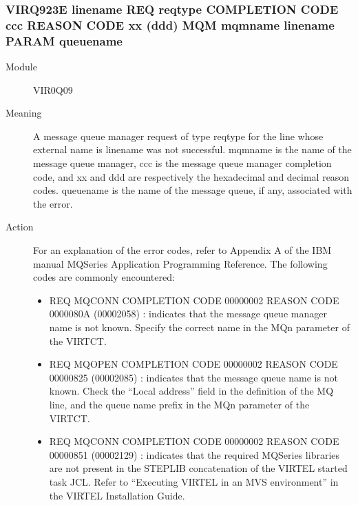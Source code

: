 \documentclass[letterpaper,10pt,english]{sphinxmanual}
\begin{document}
\subsubsection{VIRQ923E linename REQ reqtype COMPLETION CODE ccc REASON CODE xx (ddd) MQM mqmname \textbar{} linename PARAM queuename}
\label{\detokenize{messages:virq923e-linename-req-reqtype-completion-code-ccc-reason-code-xx-ddd-mqm-mqmname-linename-param-queuename}}\begin{description}
\item[{Module}] \leavevmode
VIR0Q09

\item[{Meaning}] \leavevmode
A message queue manager request of type reqtype for the line whose external name is linename was not successful. mqmname is the name of the message queue manager, ccc is the message queue manager completion code, and xx and ddd are respectively the hexadecimal and decimal reason codes. queuename is the name of the message queue, if any, associated with the error.

\item[{Action}] \leavevmode
For an explanation of the error codes, refer to Appendix A of the IBM manual MQSeries Application Programming Reference.
The following codes are commonly encountered:
\begin{itemize}
\item {} 
REQ MQCONN COMPLETION CODE 00000002 REASON CODE 0000080A (00002058) : indicates that the message queue manager name is not known. Specify the correct name in the MQn parameter of the VIRTCT.

\item {} 
REQ MQOPEN COMPLETION CODE 00000002 REASON CODE 00000825 (00002085) : indicates that the message queue name is not known. Check the “Local address” field in the definition of the MQ line, and the queue name prefix in the MQn parameter of the VIRTCT.

\item {} 
REQ MQCONN COMPLETION CODE 00000002 REASON CODE 00000851 (00002129) : indicates that the required MQSeries libraries are not present in the STEPLIB concatenation of the VIRTEL started task JCL. Refer to “Executing VIRTEL in an MVS environment” in the VIRTEL Installation Guide.

\end{itemize}

\end{description}
\end{document}
